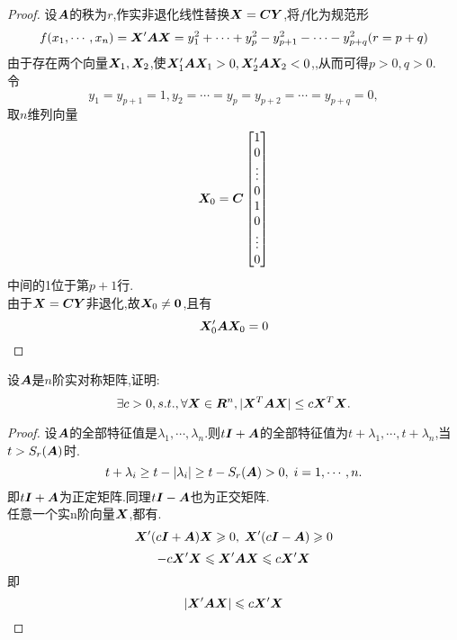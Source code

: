 \documentclass[lang=cn,11pt,normal]{elegantbook}
\begin{document}
	\begin{proof}
		设$\AA$的秩为$r$,作实非退化线性替换$\XX=\CC\YY$,将$f$化为规范形
		\begin{equation}
		f(x_1,\cdots,x_n)=\XX'\AA\XX=y_1^2+\cdots+y_p^2-y^2_{p+1}-\cdots-y^2_{p+q}(r=p+q)
		\end{equation}
		由于存在两个向量$\XX_1,\XX_2$,使$\XX'_1\AA\XX_1>0,\XX'_2\AA\XX_2<0$,,从而可得$p>0,q>0$.\\
		令
		\begin{equation}
		y_1=y_{p+1}=1,y_2=\cdots=y_p=y_{p+2}=\cdots=y_{p+q}=0,
		\end{equation}
		取$n$维列向量
		\begin{equation}
		\XX_0=\CC
		\begin{bmatrix}
		1\\0\\\vdots\\0\\1\\0\\\vdots\\0
		\end{bmatrix}
		\end{equation}
		中间的1位于第$p+1$行.\\
		由于$\XX=\CC\YY$非退化,故$\XX_0\ne\boldsymbol{0}$,且有
		\begin{equation}
		\XX'_0\AA\XX_0=0
		\end{equation}
	\end{proof}
	\begin{exercise}
		设$\AA$是$n$阶实对称矩阵,证明:
		\begin{equation}
		\exists c>0,s.t., \forall \XX\in \boldsymbol{R}^n,|\XX^T\AA\XX|\leq c\XX^T\XX.
		\end{equation}
	\end{exercise}
	\begin{proof}
		设$\AA$的全部特征值是$\lambda_1,\cdots,\lambda_n$.则$t\II+\AA$的全部特征值为$t+\lambda_1,\cdots,t+\lambda_n$,当$t>S_r(\AA)$时.
		\begin{equation}
		t+\lambda_i\geq t-|\lambda_i|\geq t-S_r(\AA)>0,\;i=1,\cdots,n.
		\end{equation}
		即$t\II+\AA$为正定矩阵.同理$t\II-\AA$也为正交矩阵.\\
		任意一个实n阶向量$\XX$,都有.
		\begin{equation}
		\XX'(c\II+\AA)\XX\geqslant 0,\;\XX'(c\II-\AA)\geqslant 0
		\end{equation}
		\begin{equation}
		-c\XX'\XX\leqslant \XX'\AA\XX\leqslant c\XX'\XX
		\end{equation}
		即
		\begin{equation}
		|\XX'\AA\XX|\leqslant c\XX'\XX
		\end{equation}
	\end{proof}
\end{document}
